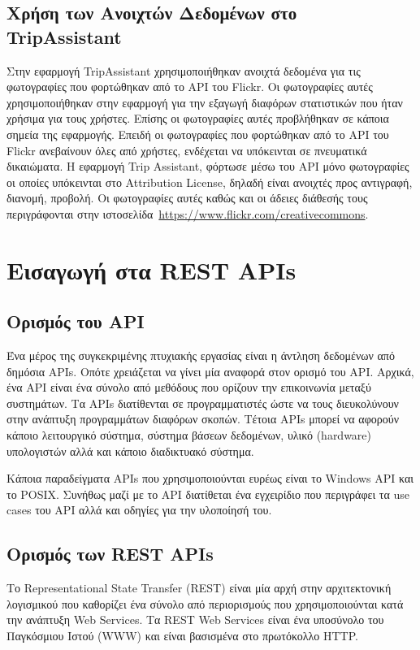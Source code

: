 \documentclass[oneside, 12pt]{book}
\begin{document}
\section{Χρήση των Ανοιχτών Δεδομένων στο TripAssistant}
Στην εφαρμογή TripAssistant χρησιμοποιήθηκαν ανοιχτά δεδομένα για τις 
φωτογραφίες που φορτώθηκαν από το API του Flickr. Οι φωτογραφίες 
αυτές χρησιμοποιήθηκαν στην εφαρμογή για την εξαγωγή διαφόρων 
στατιστικών που ήταν χρήσιμα για τους χρήστες. Επίσης οι 
φωτογραφίες αυτές προβλήθηκαν σε κάποια σημεία της εφαρμογής.
\newpage
Επειδή οι φωτογραφίες που φορτώθηκαν από το API του Flickr 
ανεβαίνουν όλες από χρήστες, ενδέχεται να υπόκεινται σε 
πνευματικά δικαιώματα. Η εφαρμογή Trip Assistant, φόρτωσε μέσω του 
API μόνο φωτογραφίες οι οποίες υπόκεινται στο Attri\-bution License, 
δηλαδή είναι ανοιχτές προς αντιγραφή, διανομή, προβολή. Οι φωτογραφίες αυτές καθώς και οι άδειες διάθεσής τους περιγράφονται 
στην ιστοσελίδα~\url{https://www.flickr.com/creativecommons}.

\chapter{Εισαγωγή στα REST APIs}
\section{Ορισμός του API}
Ένα μέρος της συγκεκριμένης πτυχιακής εργασίας είναι η άντληση δεδομένων από δημόσια APIs.
Οπότε χρειάζεται να γίνει μία αναφορά στον ορισμό του API.
Αρχικά, ένα API είναι ένα σύνολο από μεθόδους που ορίζουν την επικοινωνία μεταξύ συστημάτων. Τα APIs διατίθενται σε προγραμματιστές ώστε να τους διευκολύνουν στην ανάπτυξη προγραμμάτων διαφόρων σκοπών.
Τέτοια APIs μπορεί να αφορούν κάποιο λειτουργικό σύστημα, σύστημα βάσεων δεδομένων, υλικό (hardware) υπολογιστών αλλά και κάποιο διαδικτυακό σύστημα.

Κάποια παραδείγματα APIs που χρησιμοποιούνται ευρέως είναι το Windows API και το POSIX.
Συνήθως μαζί με το API διατίθεται ένα εγχειρίδιο που περιγράφει τα use cases του API αλλά και οδηγίες για την υλοποίησή του.

\section{Ορισμός των REST APIs}
Το Representational State Transfer (REST) είναι μία αρχή στην αρχιτεκτονική λογισμικού που καθορίζει ένα σύνολο από περιορισμούς που χρησιμοποιούνται κατά την ανάπτυξη Web Services. Τα REST Web Services είναι ένα υποσύνολο του Παγκόσμιου Ιστού (WWW) και είναι βασισμένα στο πρωτόκολλο HTTP.  
\end{document}
